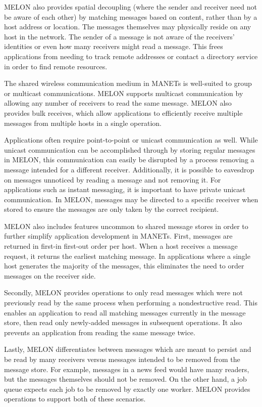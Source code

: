 \documentclass[lnicst]{svmultln}
\begin{document}
MELON also provides spatial decoupling (where the sender and receiver need not be aware of each other) by matching messages based on content, rather than by a host address or location. The messages themselves may physically reside on any host in the network. The sender of a message is not aware of the receivers' identities or even how many receivers might read a message. This frees applications from needing to track remote addresses or contact a directory service in order to find remote resources.

The shared wireless communication medium in MANETs is well-suited to group or multicast communications. MELON supports multicast communication by allowing any number of receivers to read the same message. MELON also provides bulk receives, which allow applications to efficiently receive multiple messages from multiple hosts in a single operation.

Applications often require point-to-point or unicast communication as well. While unicast communication can be accomplished through by storing regular messages in MELON, this communication can easily be disrupted by a process removing a message intended for a different receiver. Additionally, it is possible to eavesdrop on messages unnoticed by reading a message and not removing it. For applications such as instant messaging, it is important to have private unicast communication. In MELON, messages may be directed to a specific receiver when stored to ensure the messages are only taken by the correct recipient.

MELON also includes features uncommon to shared message stores in order to further simplify application development in MANETs. First, messages are returned in first-in first-out order per host. When a host receives a message request, it returns the earliest matching message. In applications where a single host generates the majority of the messages, this eliminates the need to order messages on the receiver side. 

Secondly, MELON provides operations to only read messages which were not previously read by the same process when performing a nondestructive read. This enables an application to read all matching messages currently in the message store, then read only newly-added messages in subsequent operations. It also prevents an application from reading the same message twice.

Lastly, MELON differentiates between messages which are meant to persist and be read by many receivers versus messages intended to be removed from the message store. For example, messages in a news feed would have many readers, but the messages themselves should not be removed. On the other hand, a job queue expects each job to be removed by exactly one worker. MELON provides operations to support both of these scenarios.
\end{document}
